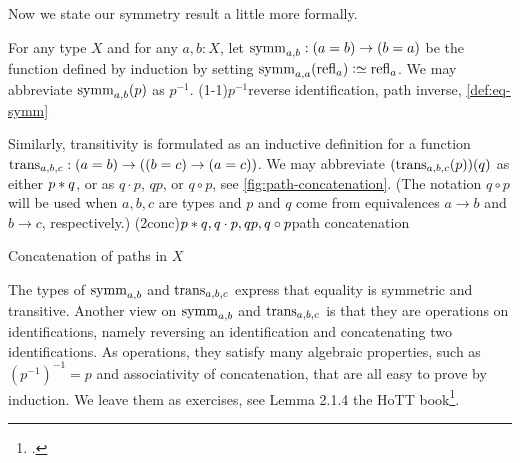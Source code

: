 Now we state our symmetry result a little more formally.

\begin{definition}\label{def:eq-symm}
For any type $X$ and for any $a,b:X$, let $\symm_{a,b} : (a=b) \to (b=a)$ 
be the function defined by induction by setting
$\symm_{a,a}(\refl a) \defeq \refl a$.
We may abbreviate $\symm_{a,b}(p)$ as $p^{-1}$.%
\glossary(1-1){$p^{-1}$}{reverse identification, path inverse, \cref{def:eq-symm}}
\end{definition}

Similarly, transitivity is formulated as an inductive definition for 
a function $\trans_{a,b,c} : (a=b) \to ((b=c) \to (a=c))$.  We may
abbreviate $(\trans_{a,b,c}(p))(q)$ as either $p* q$, 
or as $q\cdot p$, $qp$, or $q\circ p$, see \cref{fig:path-concatenation}.
(The notation $q\circ p$ will be used when $a,b,c$ are types and
$p$ and $q$ come from equivalences $a\to b$ and $b\to c$, respectively.)%
\glossary(2conc){$p\protect* q, q\cdot p, qp, q\circ p$}{path concatenation}

\begin{marginfigure}
  \caption{Concatenation of paths in $X$}
  \label{fig:path-concatenation}
\end{marginfigure}

The types of $\symm_{a,b}$ and $\trans_{a,b,c}$ express that
equality is symmetric and transitive. Another view on
$\symm_{a,b}$ and $\trans_{a,b,c}$ is that they are
operations on identifications, namely reversing an identification
and concatenating two identifications. As operations, they satisfy
many algebraic properties, such as $(p^{-1})^{-1} = p$ and
associativity of concatenation, that are all easy to prove by induction. 
We leave them as exercises, see Lemma 2.1.4 the HoTT book\footcite{hottbook}. 

